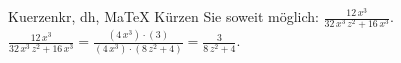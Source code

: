 \begin{MAufgabe}{Kuerzen}{kr, dh, MaTeX}
K\"urzen Sie soweit m\"oglich: $\frac{12\, x^3}{32\, x^3\, z^2 + 16\, x^3}$.\\ 
\ifLsg\MLoesung
\quad $\frac{12\, x^3}{32\, x^3\, z^2 + 16\, x^3}=\frac{(4\, x^3)\cdot(3)}{(4\, x^3)\cdot(8\, z^2 + 4)}=\frac{3}{8\, z^2 + 4}$.\else\relax\fi
 \end{MAufgabe}